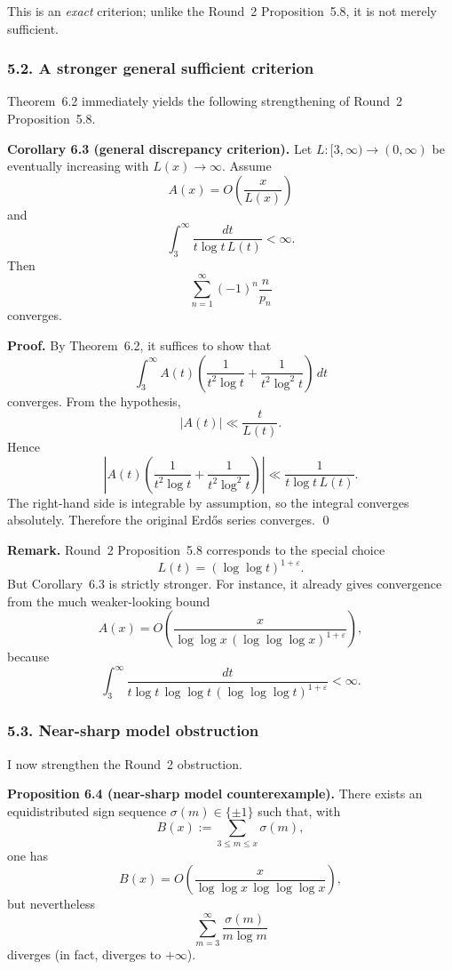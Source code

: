 \medskip

This is an \emph{exact} criterion; unlike the Round~2 Proposition~5.8, it is not merely sufficient.

\subsubsection*{5.2. A stronger general sufficient criterion}

Theorem~6.2 immediately yields the following strengthening of Round~2 Proposition~5.8.

\medskip

\textbf{Corollary 6.3 (general discrepancy criterion).}
Let \(L:[3,\infty)\to (0,\infty)\) be eventually increasing with \(L(x)\to\infty\).
Assume
\[
A(x)=O\!\left(\frac{x}{L(x)}\right)
\]
and
\[
\int_3^\infty \frac{dt}{t\log t\,L(t)}<\infty.
\]
Then
\[
\sum_{n=1}^\infty (-1)^n\frac{n}{p_n}
\]
converges.

\textbf{Proof.}
By Theorem~6.2, it suffices to show that
\[
\int_3^\infty
A(t)\left(\frac{1}{t^2\log t}+\frac{1}{t^2\log^2 t}\right)\,dt
\]
converges.
From the hypothesis,
\[
|A(t)|
\ll \frac{t}{L(t)}.
\]
Hence
\[
\left|
A(t)\left(\frac{1}{t^2\log t}+\frac{1}{t^2\log^2 t}\right)
\right|
\ll
\frac{1}{t\log t\,L(t)}.
\]
The right-hand side is integrable by assumption, so the integral converges absolutely.
Therefore the original Erd\H{o}s series converges. \qed

\medskip

\textbf{Remark.}
Round~2 Proposition~5.8 corresponds to the special choice
\[
L(t)=(\log\log t)^{1+\varepsilon}.
\]
But Corollary~6.3 is strictly stronger.
For instance, it already gives convergence from the much weaker-looking bound
\[
A(x)=O\!\left(
\frac{x}{\log\log x\,(\log\log\log x)^{1+\varepsilon}}
\right),
\]
because
\[
\int_3^\infty
\frac{dt}{t\log t\,\log\log t\,(\log\log\log t)^{1+\varepsilon}}
<\infty.
\]

\subsubsection*{5.3. Near-sharp model obstruction}

I now strengthen the Round~2 obstruction.

\medskip

\textbf{Proposition 6.4 (near-sharp model counterexample).}
There exists an equidistributed sign sequence \(\sigma(m)\in\{\pm 1\}\) such that, with
\[
B(x):=\sum_{3\le m\le x}\sigma(m),
\]
one has
\[
B(x)=O\!\left(\frac{x}{\log\log x\,\log\log\log x}\right),
\]
but nevertheless
\[
\sum_{m=3}^\infty \frac{\sigma(m)}{m\log m}
\]
diverges (in fact, diverges to \(+\infty\)).

